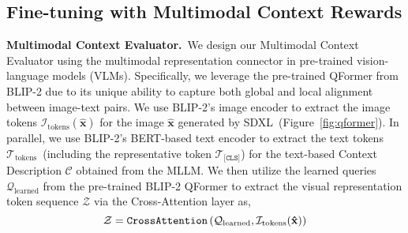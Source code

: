 \subsection{Fine-tuning with Multimodal Context Rewards}
\textbf{Multimodal Context Evaluator.}~We design our Multimodal Context Evaluator using the multimodal representation connector in pre-trained vision-language models (VLMs). Specifically, we leverage the pre-trained QFormer from BLIP-2 \citep{li2023blip} due to its unique ability to capture both global and local alignment between image-text pairs. We use BLIP-2's image encoder to extract the image tokens $\mathcal{I}_\mathrm{tokens}(\mathbf{\hat{x}})$ for the image $\mathbf{\hat{x}}$ generated by SDXL~(Figure~\ref{fig:qformer}). In parallel, we use BLIP-2's BERT-based \citep{kenton2019bert} text encoder to extract the text tokens $\mathcal{T}_{\mathrm{tokens}}$~(including the representative token $\mathcal{T}_{\texttt{[CLS]}}$) for the text-based Context Description $\mathcal{C}$ obtained from the MLLM. We then utilize the learned queries $\mathcal{Q}_\mathrm{learned}$ from the pre-trained BLIP-2 QFormer to extract the visual representation token sequence $\mathcal{Z}$ via the Cross-Attention layer as,
\begin{equation}
    \mathcal{Z} = \tt{CrossAttention}\left(\mathcal{Q}_\mathrm{learned}, \mathcal{I}_\mathrm{tokens}(\mathbf{\hat{x}})\right)
\label{eq:query_output}
\end{equation}


